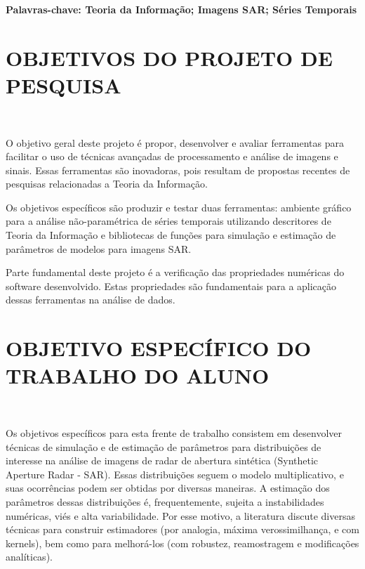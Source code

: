 \documentclass[12pt,letterpaper]{article}
\begin{document}
\textbf{Palavras-chave: Teoria da Informação; Imagens SAR; Séries Temporais} 


\newpage
\section*{\centering \textbf{OBJETIVOS DO PROJETO DE PESQUISA}}
\hrulefill \\

\vspace{0.5cm}

O objetivo geral deste projeto é propor, desenvolver e avaliar ferramentas para facilitar o uso de técnicas avançadas de processamento e análise de imagens e sinais. Essas ferramentas são inovadoras, pois resultam de propostas recentes de pesquisas relacionadas a Teoria da Informação. 

Os objetivos específicos são produzir e testar duas ferramentas: ambiente gráfico para a análise não-paramétrica de séries temporais utilizando descritores de Teoria 
da Informação e bibliotecas de funções para simulação e estimação de parâmetros de modelos para imagens SAR.

Parte fundamental deste projeto é a verificação das propriedades numéricas do software desenvolvido. Estas propriedades são fundamentais para a aplicação dessas ferramentas na análise de dados. 


\newpage
\section*{\centering \textbf{OBJETIVO ESPECÍFICO DO TRABALHO DO ALUNO}}
\hrulefill \\

\vspace{0.5cm}

Os objetivos específicos para esta frente de trabalho consistem em desenvolver técnicas de simulação e de estimação de parâmetros para distribuições de interesse na análise de imagens de radar de abertura sintética (Synthetic Aperture Radar - SAR). Essas distribuições seguem o modelo multiplicativo, e suas ocorrências podem ser obtidas por diversas maneiras. A estimação dos parâmetros dessas distribuições é, frequentemente, sujeita a instabilidades numéricas, viés e alta variabilidade. Por esse motivo, a literatura discute diversas técnicas para construir estimadores (por analogia, máxima verossimilhança, e com kernels), bem como para melhorá-los (com robustez, reamostragem e modificações analíticas).
\end{document}
